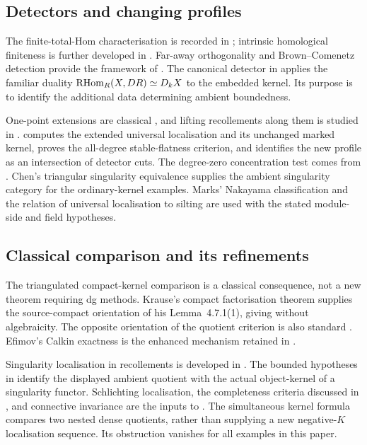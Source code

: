 \subsection{Detectors and changing profiles}
The finite-total-Hom characterisation is recorded in \cite[Lemma~4.1]{GaoPsaroudakis18}; intrinsic homological finiteness is further developed in \cite{KuznetsovShinder25}. Far-away orthogonality and Brown--Comenetz detection provide the framework of \cite{KostasPsaroudakisVitoria25}. The canonical detector in  applies the familiar duality \(\operatorname{RHom}_R(X,DR)\simeq D_kX\) to the embedded kernel. Its purpose is to identify the additional data determining ambient boundedness.

One-point extensions are classical \cite{Ringel84}, and lifting recollements along them is studied in \cite{LinLin08}.  computes the extended universal localisation and its unchanged marked kernel, proves the all-degree stable-flatness criterion, and identifies the new profile as an intersection of detector cuts. The degree-zero concentration test comes from \cite{NicolasSaorin09}. Chen's triangular singularity equivalence \cite[Theorem~4.1(1)]{ChenSchur09} supplies the ambient singularity category for the ordinary-kernel examples. Marks' Nakayama classification \cite{Marks15} and the relation of universal localisation to silting \cite{MarksStovicek19} are used with the stated module-side and field hypotheses.

\subsection{Classical comparison and its refinements}
The triangulated compact-kernel comparison is a classical consequence, not a new theorem requiring dg methods. Krause's compact factorisation theorem \cite[Theorem~7.2.1(1)]{Krause10} supplies the source-compact orientation of his Lemma~4.7.1(1), giving  without algebraicity. The opposite orientation of the quotient criterion is also standard \cite{Keller96,Krause10,SunZhangZhang}. Efimov's Calkin exactness \cite[Proposition~1.4]{Efimov17} is the enhanced mechanism retained in .

Singularity localisation in recollements is developed in \cite{JinYangZhou,SunZhangZhang}. The bounded hypotheses in  identify the displayed ambient quotient with the actual object-kernel of a singularity functor. Schlichting localisation, the completeness criteria discussed in \cite{KalckThesis,PavicShinder21}, and connective invariance \cite{BGT13} are the inputs to . The simultaneous kernel formula compares two nested dense quotients, rather than supplying a new negative-\(K\) localisation sequence. Its obstruction vanishes for all examples in this paper.

